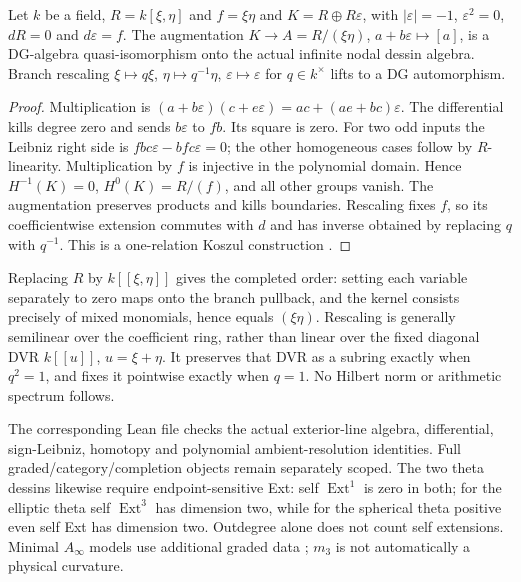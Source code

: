 \begin{proposition}\label{thm:nodal-dg}
Let $k$ be a field, $R=k[\xi,\eta]$ and $f=\xi\eta$ and $K=R\oplus R\varepsilon$, with
$|\varepsilon|=-1$, $\varepsilon^2=0$, $dR=0$ and $d\varepsilon=f$.
The augmentation $K\to A=R/(\xi\eta)$, $a+b\varepsilon\mapsto[a]$,
is a DG-algebra quasi-isomorphism onto the actual infinite nodal dessin
algebra. Branch rescaling $\xi\mapsto q\xi$, $\eta\mapsto q^{-1}\eta$,
$\varepsilon\mapsto\varepsilon$ for $q\in k^\times$ lifts to a DG automorphism.
\end{proposition}
\begin{proof}
Multiplication is $(a+b\varepsilon)(c+e\varepsilon)=ac+(ae+bc)\varepsilon$.
The differential kills degree zero and sends $b\varepsilon$ to $fb$.
Its square is zero. For two odd inputs the Leibniz right side is
$fbc\varepsilon-bfc\varepsilon=0$; the other homogeneous cases follow
by $R$-linearity. Multiplication by $f$ is injective in the polynomial
domain. Hence $H^{-1}(K)=0$, $H^0(K)=R/(f)$, and all other groups vanish.
The augmentation preserves products and kills boundaries. Rescaling fixes
$f$, so its coefficientwise extension commutes with $d$ and has inverse
obtained by replacing $q$ with $q^{-1}$. This is a one-relation Koszul
construction \cite{StacksKoszulDG,StacksKoszulRegular}.
\end{proof}
Replacing $R$ by $k[[\xi,\eta]]$ gives the completed order: setting each
variable separately to zero maps onto the branch pullback, and the kernel
consists precisely of mixed monomials, hence equals $(\xi\eta)$.
Rescaling is generally semilinear over the coefficient ring, rather than
linear over the fixed diagonal DVR $k[[u]]$, $u=\xi+\eta$.
It preserves that DVR as a subring exactly when $q^2=1$, and fixes it
pointwise exactly when $q=1$. No Hilbert norm or arithmetic spectrum follows.

The corresponding Lean file checks the actual exterior-line algebra,
differential, sign-Leibniz, homotopy and polynomial ambient-resolution
identities. Full graded/category/completion objects remain separately scoped.
The two theta dessins likewise require endpoint-sensitive Ext: self
$\operatorname{Ext}^1$ is zero in both; for the elliptic theta self
$\operatorname{Ext}^3$ has dimension two, while for the spherical theta
positive even self Ext has dimension two. Outdegree alone does not count
self extensions. Minimal $A_\infty$ models use additional graded data
\cite[\S3.3]{KellerAinf}; $m_3$ is not automatically a physical curvature.



